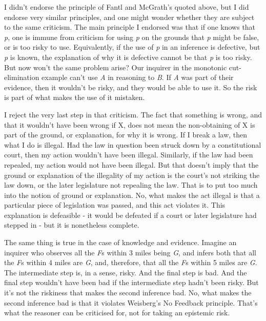 \documentclass[
  10pt,
  letterpaper,
  twoside]{scrbook}
\begin{document}
I didn't endorse the principle of Fantl and McGrath's quoted above, but
I did endorse very similar principles, and one might wonder whether they
are subject to the same criticism. The main principle I endorsed was
that if one knows that \emph{p}, one is immune from criticism for using
\emph{p} on the grounds that \emph{p} might be false, or is too risky to
use. Equivalently, if the use of \emph{p} in an inference is defective,
but \emph{p} is known, the explanation of why it is defective cannot be
that \emph{p} is too risky. But now won't the same problem arise? Our
inquirer in the monotonic cut-elimination example can't use \emph{A} in
reasoning to \emph{B}. If \emph{A} was part of their evidence, then it
wouldn't be risky, and they would be able to use it. So the risk is part
of what makes the use of it mistaken.

I reject the very last step in that criticism. The fact that something
is wrong, and that it wouldn't have been wrong if X, does not mean the
non-obtaining of X is part of the ground, or explanation, for why it is
wrong. If I break a law, then what I do is illegal. Had the law in
question been struck down by a constitutional court, then my action
wouldn't have been illegal. Similarly, if the law had been repealed, my
action would not have been illegal. But that doesn't imply that the
ground or explanation of the illegality of my action is the court's not
striking the law down, or the later legislature not repealing the law.
That is to put too much into the notion of ground or explanation. No,
what makes the act illegal is that a particular piece of legislation was
passed, and this act violates it. This explanation is defeasible - it
would be defeated if a court or later legislature had stepped in - but
it is nonetheless complete.

The same thing is true in the case of knowledge and evidence. Imagine an
inquirer who observes all the \emph{F}s within 3 miles being \emph{G},
and infers both that all the \emph{F}s within 4 miles are \emph{G}, and,
therefore, that all the \emph{F}s within 5 miles are \emph{G}. The
intermediate step is, in a sense, risky. And the final step is bad. And
the final step wouldn't have been bad if the intermediate step hadn't
been risky. But it's not the riskiness that makes the second inference
bad. No, what makes the second inference bad is that it violates
Weisberg's No Feedback principle. That's what the reasoner can be
criticised for, not for taking an epistemic risk.
\end{document}
